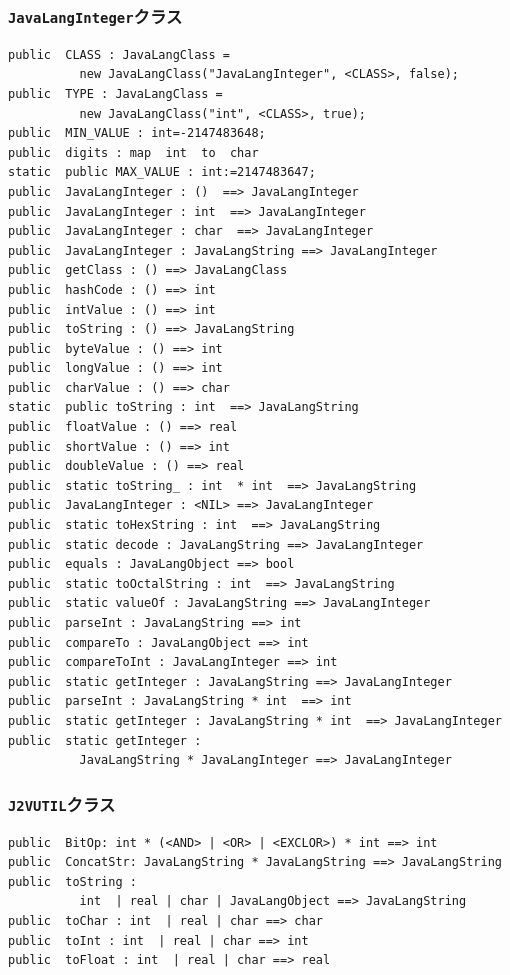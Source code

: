 \documentclass[\pformat,12pt]{jarticle}
\begin{document}
\subsubsection{\texttt{JavaLangInteger}クラス}
\begin{small}
\begin{verbatim}
public  CLASS : JavaLangClass = 
          new JavaLangClass("JavaLangInteger", <CLASS>, false);
public  TYPE : JavaLangClass =
          new JavaLangClass("int", <CLASS>, true);
public  MIN_VALUE : int=-2147483648;
public  digits : map  int  to  char
static  public MAX_VALUE : int:=2147483647;
public  JavaLangInteger : ()  ==> JavaLangInteger
public  JavaLangInteger : int  ==> JavaLangInteger
public  JavaLangInteger : char  ==> JavaLangInteger
public  JavaLangInteger : JavaLangString ==> JavaLangInteger
public  getClass : () ==> JavaLangClass
public  hashCode : () ==> int
public  intValue : () ==> int
public  toString : () ==> JavaLangString
public  byteValue : () ==> int
public  longValue : () ==> int
public  charValue : () ==> char
static  public toString : int  ==> JavaLangString
public  floatValue : () ==> real
public  shortValue : () ==> int
public  doubleValue : () ==> real
public  static toString_ : int  * int  ==> JavaLangString
public  JavaLangInteger : <NIL> ==> JavaLangInteger
public  static toHexString : int  ==> JavaLangString
public  static decode : JavaLangString ==> JavaLangInteger
public  equals : JavaLangObject ==> bool
public  static toOctalString : int  ==> JavaLangString
public  static valueOf : JavaLangString ==> JavaLangInteger
public  parseInt : JavaLangString ==> int
public  compareTo : JavaLangObject ==> int
public  compareToInt : JavaLangInteger ==> int
public  static getInteger : JavaLangString ==> JavaLangInteger
public  parseInt : JavaLangString * int  ==> int
public  static getInteger : JavaLangString * int  ==> JavaLangInteger
public  static getInteger : 
          JavaLangString * JavaLangInteger ==> JavaLangInteger
\end{verbatim}
\end{small}

\subsubsection{\texttt{J2VUTIL}クラス}
\begin{small}
\begin{verbatim}
public  BitOp: int * (<AND> | <OR> | <EXCLOR>) * int ==> int
public  ConcatStr: JavaLangString * JavaLangString ==> JavaLangString
public  toString : 
          int  | real | char | JavaLangObject ==> JavaLangString
public  toChar : int  | real | char ==> char
public  toInt : int  | real | char ==> int
public  toFloat : int  | real | char ==> real
\end{verbatim}
\end{small}
\end{document}

